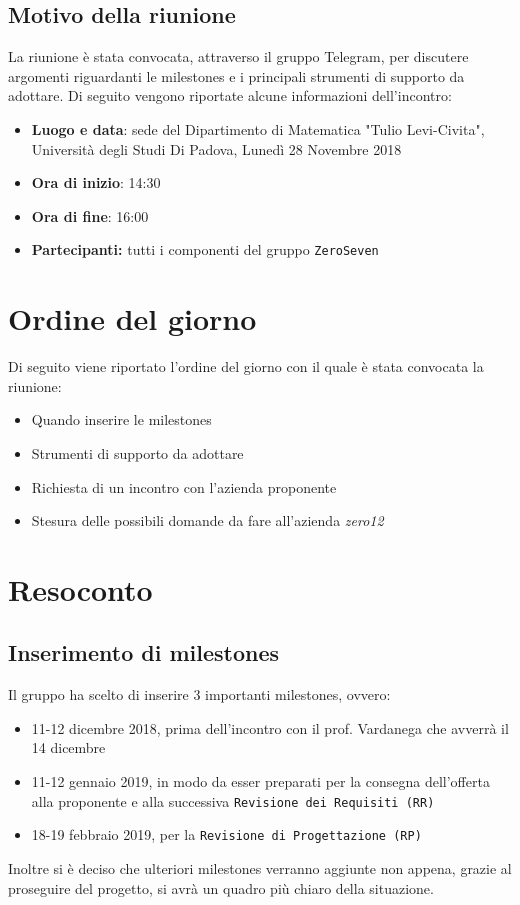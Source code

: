\documentclass[a4paper,12pt]{article}
\begin{document}
	\subsection{Motivo della riunione}
	La riunione è stata convocata, attraverso il gruppo Telegram, per discutere argomenti riguardanti le milestones e i principali strumenti di supporto da adottare.
	Di seguito vengono riportate alcune informazioni dell'incontro:
	\begin{itemize}
		\item \textbf{Luogo e data}: sede del Dipartimento di Matematica "Tulio Levi-Civita", Università degli Studi Di Padova, Lunedì 28 Novembre 2018
		\item \textbf{Ora di inizio}: 14:30
		\item \textbf{Ora di fine}: 16:00
		\item \textbf{Partecipanti: } tutti i componenti del gruppo \texttt{ZeroSeven} 
	\end{itemize}
	\section{Ordine del giorno}
	Di seguito viene riportato l'ordine del giorno con il quale è stata convocata la riunione:
	\begin{itemize}
		\item Quando inserire le milestones
		\item Strumenti di supporto da adottare
		\item Richiesta di un incontro con l'azienda proponente
		\item Stesura delle possibili domande da fare all'azienda \textit{zero12}
	\end{itemize}
	\section{Resoconto}
	\subsection{Inserimento di milestones}
	Il gruppo ha scelto di inserire 3 importanti milestones, ovvero:
	\begin{itemize}
		\item 11-12 dicembre 2018, prima dell'incontro con il prof. Vardanega che avverrà il 14 dicembre
		\item 11-12 gennaio 2019, in modo da esser preparati per la consegna dell'offerta alla proponente e alla successiva \texttt{Revisione dei Requisiti (RR)}
		\item 18-19 febbraio 2019, per la \texttt{Revisione di Progettazione (RP)}
	\end{itemize}
	Inoltre si è deciso che ulteriori milestones verranno aggiunte non appena, grazie al proseguire del progetto, si avrà un quadro più chiaro della situazione.
\end{document}
